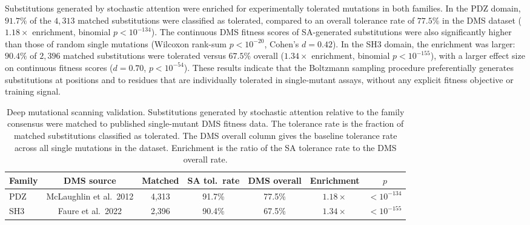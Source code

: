 \documentclass[10pt]{article}
\begin{document}
Substitutions generated by stochastic attention were enriched for experimentally tolerated mutations in both families. In the PDZ domain, $91.7\%$ of the $4{,}313$ matched substitutions were classified as tolerated, compared to an overall tolerance rate of $77.5\%$ in the DMS dataset ($1.18\times$ enrichment, binomial $p < 10^{-134}$). The continuous DMS fitness scores of SA-generated substitutions were also significantly higher than those of random single mutations (Wilcoxon rank-sum $p < 10^{-20}$, Cohen's $d{=}0.42$). In the SH3 domain, the enrichment was larger: $90.4\%$ of $2{,}396$ matched substitutions were tolerated versus $67.5\%$ overall ($1.34\times$ enrichment, binomial $p < 10^{-155}$), with a larger effect size on continuous fitness scores ($d{=}0.70$, $p < 10^{-54}$). These results indicate that the Boltzmann sampling procedure preferentially generates substitutions at positions and to residues that are individually tolerated in single-mutant assays, without any explicit fitness objective or training signal.

\begin{table}[ht]
\centering
\caption{Deep mutational scanning validation. Substitutions generated by stochastic attention relative to the family consensus were matched to published single-mutant DMS fitness data. The tolerance rate is the fraction of matched substitutions classified as tolerated. The DMS overall column gives the baseline tolerance rate across all single mutations in the dataset. Enrichment is the ratio of the SA tolerance rate to the DMS overall rate.}
\label{tab:dms}
\small
\begin{tabular}{@{}lcccccc@{}}
\toprule
Family & DMS source & Matched & SA tol.\ rate & DMS overall & Enrichment & $p$ \\
\midrule
PDZ & McLaughlin et al.\ 2012 & 4{,}313 & 91.7\% & 77.5\% & $1.18\times$ & $<10^{-134}$ \\
SH3 & Faure et al.\ 2022      & 2{,}396 & 90.4\% & 67.5\% & $1.34\times$ & $<10^{-155}$ \\
\bottomrule
\end{tabular}
\end{table}
\end{document}
